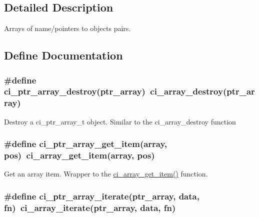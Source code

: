 \subsection{Detailed Description}
Arrays of name/pointers to objects pairs. 

\subsection{Define Documentation}
\hypertarget{group__PTR__ARRAYS_ga670e8fc238f88ff9b93c9d4478549153}{
\subsubsection[{ci\_\-ptr\_\-array\_\-destroy}]{\setlength{\rightskip}{0pt plus 5cm}\#define ci\_\-ptr\_\-array\_\-destroy(ptr\_\-array)~ci\_\-array\_\-destroy(ptr\_\-array)}}
\label{group__PTR__ARRAYS_ga670e8fc238f88ff9b93c9d4478549153}


Destroy a ci\_\-ptr\_\-array\_\-t object. Similar to the ci\_\-array\_\-destroy function \hypertarget{group__PTR__ARRAYS_gadb3b7e1e10a8832240291d8d45b173f9}{
\subsubsection[{ci\_\-ptr\_\-array\_\-get\_\-item}]{\setlength{\rightskip}{0pt plus 5cm}\#define ci\_\-ptr\_\-array\_\-get\_\-item(array, \/  pos)~ci\_\-array\_\-get\_\-item(array, pos)}}
\label{group__PTR__ARRAYS_gadb3b7e1e10a8832240291d8d45b173f9}


Get an array item. Wrapper to the \hyperlink{group__SIMPLE__ARRAYS_gabdd79d08b37d9bfd1577ce52ece12a5c}{ci\_\-array\_\-get\_\-item()} function. \hypertarget{group__PTR__ARRAYS_ga407fe3c0c3ccd87635de7dc2b3b8c1b9}{
\subsubsection[{ci\_\-ptr\_\-array\_\-iterate}]{\setlength{\rightskip}{0pt plus 5cm}\#define ci\_\-ptr\_\-array\_\-iterate(ptr\_\-array, \/  data, \/  fn)~ci\_\-array\_\-iterate(ptr\_\-array, data, fn)}}
\label{group__PTR__ARRAYS_ga407fe3c0c3ccd87635de7dc2b3b8c1b9}


